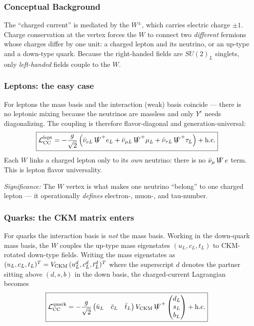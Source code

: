 \subsubsection*{Conceptual Background}

The ``charged current'' is mediated by the $W^\pm$, which carries
electric charge $\pm1$. Charge conservation at the vertex forces the
$W$ to connect two \emph{different} fermions whose charges differ by one
unit: a charged lepton and its neutrino, or an up-type and a down-type
quark. Because the right-handed fields are $SU(2)_L$ singlets, only
\emph{left-handed} fields couple to the $W$.

\subsubsection*{Leptons: the easy case}

For leptons the mass basis and the interaction (weak) basis coincide
--- there is no leptonic mixing because the neutrinos are massless and
only $Y^e$ needs diagonalizing. The coupling is therefore
flavor-diagonal and generation-universal:
\begin{equation}
  \boxed{
    \mathcal{L}_{\rm CC}^{\rm lept}
    = -\frac{g}{\sqrt2}
      \left(
        \bar\nu_{eL}\,\slashed{W}^+ e_L
        + \bar\nu_{\mu L}\,\slashed{W}^+ \mu_L
        + \bar\nu_{\tau L}\,\slashed{W}^+ \tau_L
      \right) + \text{h.c.}
  }
  \label{eq:lec21:cc-lept}
\end{equation}
Each $W$ links a charged lepton only to its \emph{own} neutrino: there
is no $\bar\nu_\mu\,\slashed W\,e$ term. This is lepton flavor
universality.

\textit{Significance:} The $W$ vertex is what makes one neutrino
``belong'' to one charged lepton --- it operationally \emph{defines}
electron-, muon-, and tau-number.

\subsubsection*{Quarks: the CKM matrix enters}

For quarks the interaction basis is \emph{not} the mass basis. Working
in the down-quark mass basis, the $W$ couples the up-type mass
eigenstates $(u_L,c_L,t_L)$ to CKM-rotated down-type fields. Writing the
mass eigenstates as $(u_L,c_L,t_L)^T = V_{\rm CKM}\,(u^d_L,c^d_L,t^d_L)^T$
where the superscript $d$ denotes the partner sitting above $(d,s,b)$ in
the down basis, the charged-current Lagrangian becomes
\begin{equation}
  \boxed{
    \mathcal{L}_{\rm CC}^{\rm quark}
    = -\frac{g}{\sqrt2}
      \begin{pmatrix}\bar u_L & \bar c_L & \bar t_L\end{pmatrix}
      V_{\rm CKM}\,\slashed{W}^+
      \begin{pmatrix} d_L \\ s_L \\ b_L \end{pmatrix}
    + \text{h.c.}
  }
  \label{eq:lec21:cc-quark}
\end{equation}

